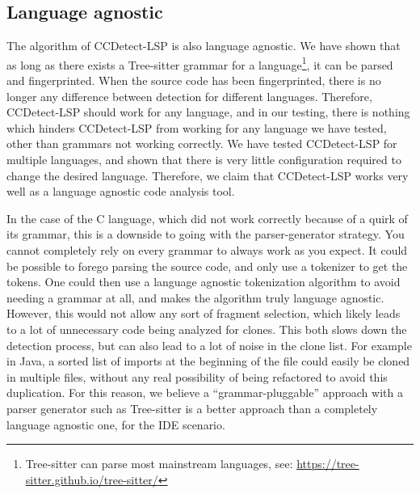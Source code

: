\subsection*{Language agnostic}

The algorithm of CCDetect-LSP is also language agnostic. We have shown that as long as
there exists a Tree-sitter grammar for a language\footnote{Tree-sitter can parse most
mainstream languages, see: \url{https://tree-sitter.github.io/tree-sitter/}}, it can be
parsed and fingerprinted. When the source code has been fingerprinted, there is no longer
any difference between detection for different languages. Therefore, CCDetect-LSP should
work for any language, and in our testing, there is nothing which hinders CCDetect-LSP
from working for any language we have tested, other than grammars not working correctly.
We have tested CCDetect-LSP for multiple languages, and shown that there is very little
configuration required to change the desired language. Therefore, we claim that
CCDetect-LSP works very well as a language agnostic code analysis tool.

In the case of the C language, which did not work correctly because of a quirk of its
grammar, this is a downside to going with the parser-generator strategy. You cannot
completely rely on every grammar to always work as you expect. It could be possible to
forego parsing the source code, and only use a tokenizer to get the tokens. One could then
use a language agnostic tokenization algorithm to avoid needing a grammar at all, and
makes the algorithm truly language agnostic. However, this would not allow any sort of
fragment selection, which likely leads to a lot of unnecessary code being analyzed for
clones. This both slows down the detection process, but can also lead to a lot of noise in
the clone list. For example in Java, a sorted list of imports at the beginning of the file
could easily be cloned in multiple files, without any real possibility of being refactored
to avoid this duplication. For this reason, we believe a ``grammar-pluggable'' approach
with a parser generator such as Tree-sitter is a better approach than a completely
language agnostic one, for the IDE scenario.
